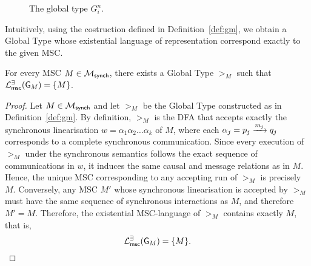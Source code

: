 \begin{definition}[$G_i^n$]
\begin{figure}[!ht]
		\caption{The global type $G_i^n$.}
		\label{fig:gni}
	\end{figure}

\end{definition}


Intuitively, using the costruction defined in Definition~\ref{def:gm},
we obtain a Global Type whose existential language of representation
correspond exactly to the given MSC. 

\bigskip

\begin{lemma}\label{lem:gm}
For every MSC $M \in \mscsetofmodel{\synchmodel}$,  
there exists a Global Type $\gt_M$ such that  
$\existentialmsclanguageof{\gt_M} = \{ M \}$.
\end{lemma}

\begin{proof}
Let $M \in \mscsetofmodel{\synchmodel}$ and let $\gt_M$ be the Global Type  
constructed as in Definition~\ref{def:gm}.  
By definition, $\gt_M$ is the DFA that accepts exactly  
the synchronous linearisation  
$w = \alpha_1 \alpha_2 \ldots \alpha_k$ of $M$,  
where each $\alpha_j = \marrow{p_j}{q_j}{m_j}$  
corresponds to a complete synchronous communication.  
Since every execution of $\gt_M$ under the synchronous semantics  
follows the exact sequence of communications in $w$,  
it induces the same causal and message relations as in $M$.  
Hence, the unique MSC corresponding to any accepting run of $\gt_M$  
is precisely $M$.  
Conversely, any MSC $M'$ whose synchronous linearisation is accepted  
by $\gt_M$ must have the same sequence of synchronous interactions as $M$,  
and therefore $M' = M$.  
Therefore, the existential MSC-language of $\gt_M$ contains exactly $M$,  
that is,
\[
    \existentialmsclanguageof{\gt_M} = \{ M \}.
\]
\end{proof}


